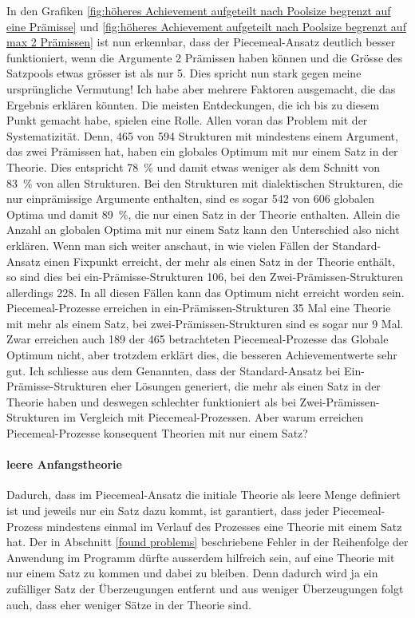 \documentclass{article}
\begin{document}
In den Grafiken \ref{fig:höheres Achievement aufgeteilt nach Poolsize begrenzt auf eine Prämisse} und \ref{fig:höheres Achievement aufgeteilt nach Poolsize begrenzt auf max 2 Prämissen} ist nun erkennbar, dass der Piecemeal-Ansatz deutlich besser funktioniert, wenn die Argumente 2 Prämissen haben können und die Grösse des Satzpools etwas grösser ist als nur 5. Dies spricht nun stark gegen meine ursprüngliche Vermutung! Ich habe aber mehrere Faktoren ausgemacht, die das Ergebnis erklären könnten. Die meisten Entdeckungen, die ich bis zu diesem Punkt gemacht habe, spielen eine Rolle. Allen voran das Problem mit der Systematizität. Denn, 465 von 594 Strukturen mit mindestens einem Argument, das zwei Prämissen hat, haben ein globales Optimum mit nur einem Satz in der Theorie. Dies entspricht 78~\% und damit etwas weniger als dem Schnitt von 83~\% von allen Strukturen. Bei den Strukturen mit dialektischen Strukturen, die nur einprämissige Argumente enthalten, sind es sogar 542 von 606 globalen Optima und damit 89~\%, die nur einen Satz in der Theorie enthalten. Allein die Anzahl an globalen Optima mit nur einem Satz kann den Unterschied also nicht erklären. Wenn man sich weiter anschaut, in wie vielen Fällen der Standard-Ansatz einen Fixpunkt erreicht, der mehr als einen Satz in der Theorie enthält, so sind dies bei ein-Prämisse-Strukturen 106, bei den Zwei-Prämissen-Strukturen allerdings 228. In all diesen Fällen kann das Optimum nicht erreicht worden sein. Piecemeal-Prozesse erreichen in ein-Prämissen-Strukturen 35 Mal eine Theorie mit mehr als einem Satz, bei zwei-Prämissen-Strukturen sind es sogar nur 9 Mal. Zwar erreichen auch 189 der 465 betrachteten Piecemeal-Prozesse das Globale Optimum nicht, aber trotzdem erklärt dies, die besseren Achievementwerte sehr gut. Ich schliesse aus dem Genannten, dass der Standard-Ansatz bei Ein-Prämisse-Strukturen eher Lösungen generiert, die mehr als einen Satz in der Theorie haben und deswegen schlechter funktioniert als bei Zwei-Prämissen-Strukturen im Vergleich mit Piecemeal-Prozessen. Aber warum erreichen Piecemeal-Prozesse konsequent Theorien mit nur einem Satz?

\paragraph{leere Anfangstheorie} Dadurch, dass im Piecemeal-Ansatz die initiale Theorie als leere Menge definiert ist und jeweils nur ein Satz dazu kommt, ist garantiert, dass jeder Piecemeal-Prozess mindestens einmal im Verlauf des Prozesses eine Theorie mit einem Satz hat. Der in Abschnitt \ref{found problems} beschriebene Fehler in der Reihenfolge der Anwendung im Programm dürfte ausserdem hilfreich sein, auf eine Theorie mit nur einem Satz zu kommen und dabei zu bleiben. Denn dadurch wird ja ein zufälliger Satz der Überzeugungen entfernt und aus weniger Überzeugungen folgt auch, dass eher weniger Sätze in der Theorie sind.
\end{document}
